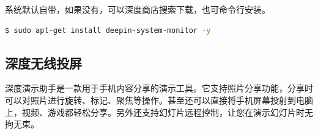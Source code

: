 \documentclass[doctor,openright,twoside]{sjtuthesis}
\theoremstyle{plain}
\theoremstyle{definition}
\theoremstyle{remark}
\theoremstyle{ocrenumbox}
\theoremstyle{plain}
\begin{document}

系统默认自带，如果没有，可以深度商店搜索下载，也可命令行安装。

\begin{lstlisting}[language=bash]
$ sudo apt-get install deepin-system-monitor -y
\end{lstlisting}

\subsection{深度无线投屏}

深度演示助手是一款用于手机内容分享的演示工具。它支持照片分享功能，分享时可以对照片进行旋转、标记、聚焦等操作。甚至还可以直接将手机屏幕投射到电脑上，视频、游戏都轻松分享。另外还支持幻灯片远程控制，让您在演示幻灯片时无拘无束。
\end{document}
